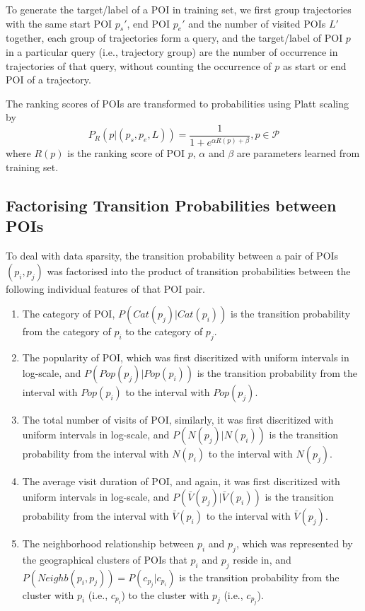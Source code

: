 \documentclass{sig-alternate-05-2015}
\begin{document}
To generate the target/label of a POI in training set,
we first group trajectories with the same start POI $p_s'$, end POI $p_e'$ and the number of visited POIs $L'$ together,
each group of trajectories form a query,
and the target/label of POI $p$ in a particular query (i.e., trajectory group) are the number of occurrence
in trajectories of that query, 
without counting the occurrence of $p$ as start or end POI of a trajectory.

The ranking scores of POIs are transformed to probabilities using Platt scaling\cite{platt99} by
\begin{displaymath}
    P_R(p |(p_s, p_e, L)) = \frac{1}{1 + e^{\alpha R(p) + \beta}}, p \in \mathcal{P}
\end{displaymath}
where $R(p)$ is the ranking score of POI $p$, $\alpha$ and $\beta$ are parameters learned from training set\cite{plattnote07}.


\subsection{Factorising Transition Probabilities between POIs}
To deal with data sparsity,
the transition probability between a pair of POIs $(p_i, p_j)$ was factorised into the product of
transition probabilities between the following individual features of that POI pair.
\begin{enumerate}
\item The category of POI, $P(Cat(p_j) | Cat(p_i))$
      is the transition probability from the category of $p_i$ to the category of $p_j$.
\item The popularity of POI, which was first discritized with uniform intervals in log-scale,
      and $P(Pop(p_j) | Pop(p_i))$ is the transition probability from the interval with $Pop(p_i)$ 
      to the interval with $Pop(p_j)$.
\item The total number of visits of POI, similarly, it was first discritized with uniform intervals in log-scale,
      and $P(N(p_j) | N(p_i))$ is the transition probability from the interval with $N(p_i)$ 
      to the interval with $N(p_j)$.
\item The average visit duration of POI, and again, it was first discritized with uniform intervals in log-scale,
      and $P(\bar{V}(p_j) | \bar{V}(p_i))$ is the transition probability from the interval with $\bar{V}(p_i)$ 
      to the interval with $\bar{V}(p_j)$.
\item The neighborhood relationship between $p_i$ and $p_j$,
      which was represented by the geographical clusters of POIs that $p_i$ and $p_j$ reside in,
      and $P(Neighb(p_i, p_j)) = P(c_{p_j} | c_{p_i})$ is the transition probability from the cluster with 
      $p_i$ (i.e., $c_{p_i}$) to the cluster with $p_j$ (i.e., $c_{p_j}$).
\end{enumerate}
\end{document}
